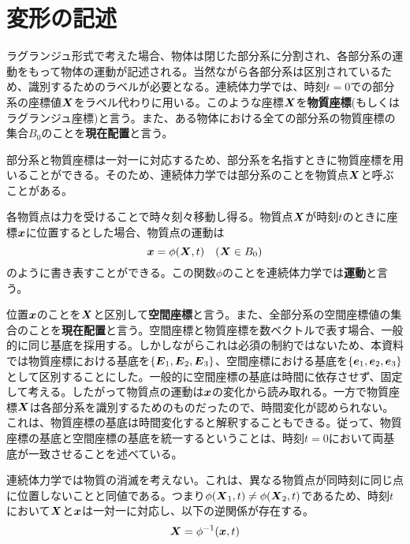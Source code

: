 \documentclass[dvipdfmx, 9pt, a4paper]{jsarticle}
\numberwithin{equation}{section}
\newcommand{\bm}[1]{{\mbox{\boldmath $#1$}}}
\begin{document}
\section{変形の記述}
ラグランジュ形式で考えた場合、物体は閉じた部分系に分割され、各部分系の運動をもって物体の運動が記述される。当然ながら各部分系は区別されているため、識別するためのラベルが必要となる。連続体力学では、時刻$t=0$での部分系の座標値$\bm X$をラベル代わりに用いる。このような座標$\bm X$を{\bf 物質座標}(もしくはラグランジュ座標)と言う。また、ある物体における全ての部分系の物質座標の集合$B_0$のことを{\bf 現在配置}と言う。\par
部分系と物質座標は一対一に対応するため、部分系を名指すときに物質座標を用いることができる。そのため、連続体力学では部分系のことを物質点$\bm X$と呼ぶことがある。\par
各物質点は力を受けることで時々刻々移動し得る。物質点$\bm X$が時刻$t$のときに座標$\bm x$に位置するとした場合、物質点の運動は
\begin{equation}
\bm x=\phi(\bm X, t)~~~(\bm X \in B_0)
\end{equation}
のように書き表すことができる。この関数$\phi$のことを連続体力学では{\bf 運動}と言う。\par
位置$\bm x$のことを$\bm X$と区別して{\bf 空間座標}と言う。また、全部分系の空間座標値の集合のことを{\bf 現在配置}と言う。空間座標と物質座標を数ベクトルで表す場合、一般的に同じ基底を採用する。しかしながらこれは必須の制約ではないため、本資料では物質座標における基底を$\{\bm E_1, \bm E_2, \bm E_3\}$、空間座標における基底を$\{\bm e_1, \bm e_2, \bm e_3\}$として区別することにした。一般的に空間座標の基底は時間に依存させず、固定して考える。したがって物質点の運動は$\bm x$の変化から読み取れる。一方で物質座標$\bm X$は各部分系を識別するためのものだったので、時間変化が認められない。これは、物質座標の基底は時間変化すると解釈することもできる。従って、物質座標の基底と空間座標の基底を統一するということは、時刻$t=0$において両基底が一致させることを述べている。\par
連続体力学では物質の消滅を考えない。これは、異なる物質点が同時刻に同じ点に位置しないことと同値である。つまり$\phi(\bm X_1, t) \neq \phi(\bm X_2, t)$であるため、時刻$t$において$\bm X$と$\bm x$は一対一に対応し、以下の逆関係が存在する。
\begin{equation}
\bm X=\phi^{-1}(\bm x, t)
\end{equation}
\end{document}
